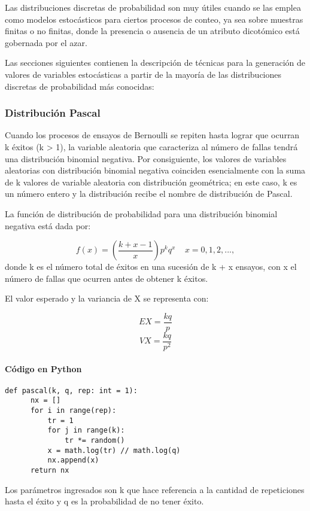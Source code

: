 \documentclass{article}
\begin{document}
  Las distribuciones discretas de probabilidad son muy útiles cuando se las emplea como modelos estocásticos para ciertos procesos de conteo, ya sea sobre muestras finitas o no finitas, donde la presencia o ausencia de un atributo dicotómico está gobernada por el azar.

  Las secciones siguientes contienen la descripción de técnicas para la generación de valores de variables estocásticas a partir de la mayoría de las distribuciones discretas de probabilidad más conocidas:

  \subsubsection{Distribución Pascal}
  Cuando los procesos de ensayos de Bernoulli se repiten hasta lograr que ocurran k éxitos (k > 1), la variable aleatoria que caracteriza al número de fallas tendrá una distribución binomial negativa.
  Por consiguiente, los valores de variables aleatorias con distribución binomial negativa coinciden esencialmente con la suma de k valores de variable aleatoria con distribución geométrica; en este caso, k es un
  número entero y la distribución recibe el nombre de distribución de Pascal.

  La función de distribución de probabilidad para una distribución binomial negativa está dada por:

  \begin{equation}
    f(x) = (\frac{k+x-1}{x})p^{k}q^{x} \ \text{   } \ x = 0,1,2,...,
  \end{equation}
  donde k es el número total de éxitos en una sucesión de k + x ensayos, con x el número de fallas que ocurren antes de obtener k éxitos.

  El valor esperado y la variancia de X se representa con:

  \begin{equation}
    EX = \frac{kq}{p}
  \end{equation}
  \begin{equation}
    VX = \frac{kq}{p^2}
  \end{equation}

  \paragraph{Código en Python}
  \begin{lstlisting}[style = Python]
    def pascal(k, q, rep: int = 1):
      nx = []
      for i in range(rep):
          tr = 1
          for j in range(k):
              tr *= random()
          x = math.log(tr) // math.log(q)
          nx.append(x)
      return nx
  \end{lstlisting}
  Los parámetros ingresados son k que hace referencia a la cantidad de repeticiones hasta el éxito y q es la probabilidad de no tener éxito.
\end{document}
